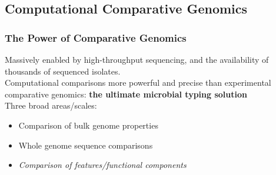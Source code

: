 
\subsection{Computational Comparative Genomics}

\begin{frame}
  \frametitle{The Power of Comparative Genomics}
  Massively enabled by high-throughput sequencing, and the availability of thousands of sequenced isolates.\\[0.5cm]
  Computational comparisons more powerful and precise than experimental comparative genomics: \textbf{the ultimate microbial typing solution}\\[0.5cm]
  Three broad areas/scales:
  \begin{itemize}
    \item Comparison of bulk genome properties
    \item Whole genome sequence comparisons
    \item \textit{Comparison of features/functional components}
  \end{itemize}    
\end{frame}

